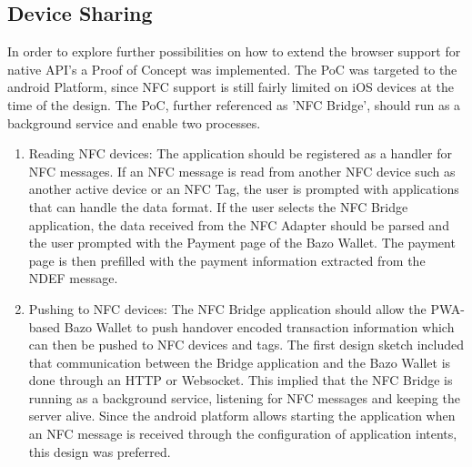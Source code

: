 \subsection{Device Sharing}
In order to explore further possibilities on how to extend the browser support for native API's a Proof of Concept was implemented. The PoC was targeted to the android Platform, since NFC support is still fairly limited on iOS devices at the time of the design. The PoC, further referenced as 'NFC Bridge', should run as a background service and enable two processes.
\begin{enumerate}
\item Reading NFC devices:
The application should be registered as a handler for NFC messages. If an NFC message is read from another NFC device such as another active device or an NFC Tag, the user is prompted with applications that can handle the data format. If the user selects the NFC Bridge application, the data received from the NFC Adapter should be parsed and the user prompted with the Payment page of the Bazo Wallet. The payment page is then prefilled with the payment information extracted from the NDEF message.
\item Pushing to NFC devices: The NFC Bridge application should allow the PWA-based Bazo Wallet to push handover encoded transaction information which can then be pushed to NFC devices and tags.
The first design sketch included that communication between the Bridge application and the Bazo Wallet is done through an HTTP or Websocket. This implied that the NFC Bridge is running as a background service, listening for NFC messages and keeping the server alive.
Since the android platform allows starting the application when an NFC message is received through the configuration of application intents, this design was preferred.
\end{enumerate}

